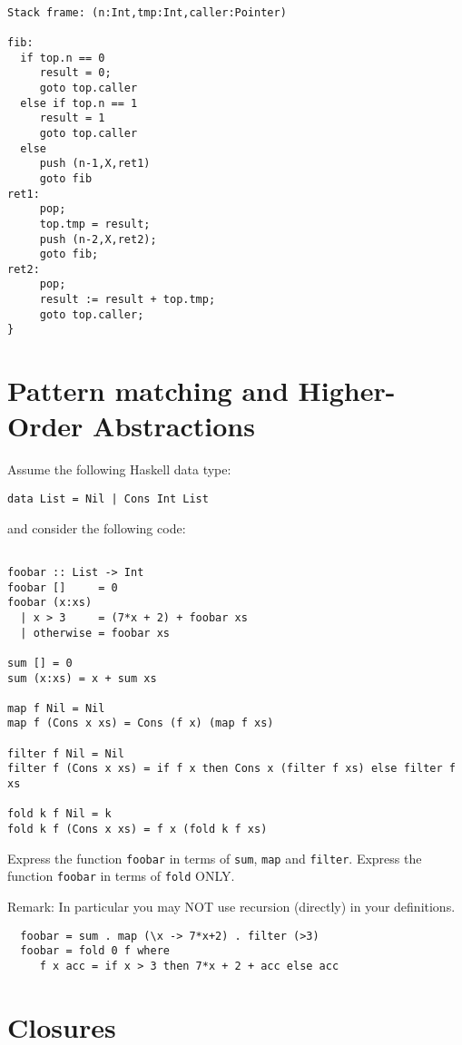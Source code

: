 \documentclass{article}
\newcommand{\answer}[1]{}
\begin{document}
\answer{}{
  \begin{verbatim}
    
Stack frame: (n:Int,tmp:Int,caller:Pointer)

fib:
  if top.n == 0
     result = 0;
     goto top.caller
  else if top.n == 1
     result = 1
     goto top.caller
  else
     push (n-1,X,ret1)
     goto fib
ret1:
     pop;
     top.tmp = result;
     push (n-2,X,ret2);
     goto fib;
ret2:
     pop;
     result := result + top.tmp;
     goto top.caller;  
}

  \end{verbatim}

\newpage
\section{Pattern matching and Higher-Order Abstractions}

Assume the following Haskell data type:
\begin{verbatim}
data List = Nil | Cons Int List
\end{verbatim}
and consider the following code:
\begin{verbatim}

foobar :: List -> Int
foobar []     = 0
foobar (x:xs)
  | x > 3     = (7*x + 2) + foobar xs
  | otherwise = foobar xs

sum [] = 0
sum (x:xs) = x + sum xs

map f Nil = Nil
map f (Cons x xs) = Cons (f x) (map f xs)

filter f Nil = Nil
filter f (Cons x xs) = if f x then Cons x (filter f xs) else filter f xs

fold k f Nil = k
fold k f (Cons x xs) = f x (fold k f xs)
\end{verbatim}

Express the function \texttt{foobar} in terms of \texttt{sum}, \texttt{map} and \texttt{filter}.
Express the function \texttt{foobar} in terms of \texttt{fold} ONLY.

Remark: In particular you may NOT use recursion (directly) in your definitions.

\answer{}{
  \begin{verbatim}
  foobar = sum . map (\x -> 7*x+2) . filter (>3)
  foobar = fold 0 f where
     f x acc = if x > 3 then 7*x + 2 + acc else acc    
   \end{verbatim}
}


\newpage
\section{Closures}

}
\end{document}
